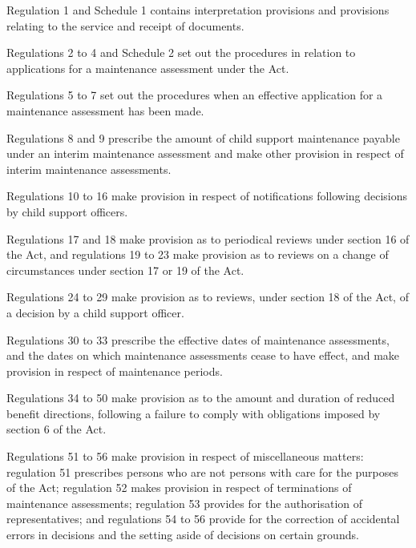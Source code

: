\documentclass[a4paper]{article}
\begin{document}
  Regulation 1 and Schedule 1 contains interpretation provisions and provisions relating to the service and receipt of documents.

  Regulations 2 to 4 and Schedule 2 set out the procedures in relation to applications for a maintenance assessment under the Act.

  Regulations 5 to 7 set out the procedures when an effective application for a maintenance assessment has been made.

  Regulations 8 and 9 prescribe the amount of child support maintenance payable under an interim maintenance assessment and make other provision in respect of interim maintenance assessments.

  Regulations 10 to 16 make provision in respect of notifications following decisions by child support officers.

  Regulations 17 and 18 make provision as to periodical reviews under section 16 of the Act, and regulations 19 to 23 make provision as to reviews on a change of circumstances under section 17 or 19 of the Act.

  Regulations 24 to 29 make provision as to reviews, under section 18 of the Act, of a decision by a child support officer.

  Regulations 30 to 33 prescribe the effective dates of maintenance assessments, and the dates on which maintenance assessments cease to have effect, and make provision in respect of maintenance periods.

  Regulations 34 to 50 make provision as to the amount and duration of reduced benefit directions, following a failure to comply with obligations imposed by section 6 of the Act.

  Regulations 51 to 56 make provision in respect of miscellaneous matters: regulation 51 prescribes persons who are not persons with care for the purposes of the Act; regulation 52 makes provision in respect of terminations of maintenance assessments; regulation 53 provides for the authorisation of representatives; and regulations 54 to 56 provide for the correction of accidental errors in decisions and the setting aside of decisions on certain grounds.
\end{document}

